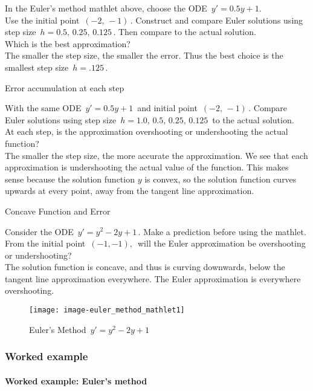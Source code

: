 In the Euler's method mathlet above, choose the ODE $\, y' = 0.5y+1$. \\
Use the initial point $\,(−2, \, −1)\,$. Construct and
compare Euler solutions using step size $\, h= 0.5,\, 0.25,\, 0.125\,$.
Then compare to the actual solution. \\

Which is the best approximation? \\
The smaller the step size, the smaller the error.
Thus the best choice is the smallest step size $\, h =.125 \,$.

\begin{exercise}
  Error accumulation at each step
\end{exercise}

With the same ODE $\, y' = 0.5y+1 \,$ and initial point $\, (−2,\, −1)\,$.
Compare Euler solutions using step size $\, h = 1.0,\, 0.5,\, 0.25,\, 0.125\, $ to the actual solution.\\

At each step, is the approximation overshooting or undershooting the actual function? \\
The smaller the step size, the more accurate the approximation.
We see that each approximation is undershooting the actual value of the function.
This makes sense because the solution function $y$ is convex,
so the solution function curves upwards at every point, away from the tangent line approximation.

\clearpage

\begin{exercise}
  Concave Function and Error
\end{exercise}

Consider the ODE $\, y' = y^2 - 2y +1\,$. Make a prediction before using the mathlet.
From the initial point $\, (−1,  −1),\,$ will the Euler approximation be overshooting or undershooting?\\

The solution function is concave, and thus is curving downwards,
below the tangent line approximation everywhere.
The Euler approximation is everywhere overshooting.

\begin{figure}[ht!]
  \centering
  \texttt{[image: image-euler\_method\_mathlet1]}
  \caption{Euler's Method $\, y' = y^2 - 2y +1\,$}
\end{figure}

\clearpage

\subsubsection{Worked example}

\paragraph{Worked example: Euler's method}


